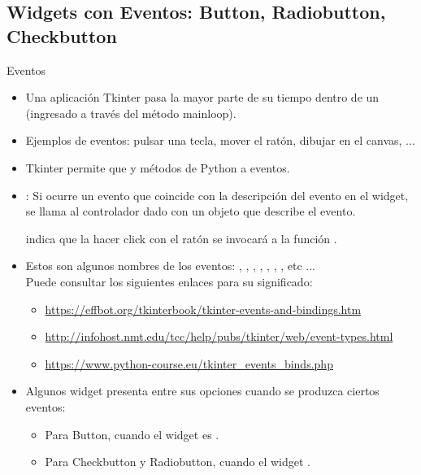 \documentclass[10pt, envcountsect , spanish]{beamer}
\begin{document}
\subsection{Widgets con Eventos: Button, Radiobutton, Checkbutton}


\begin{frame}{Eventos}

\begin{itemize}
\item Una aplicación Tkinter pasa la mayor parte de su tiempo dentro de un  (ingresado a través del método mainloop). 
\item Ejemplos de eventos: pulsar una tecla, mover el ratón, dibujar en el canvas, ...
\item Tkinter permite que  y métodos de Python a eventos.

\item {}: Si ocurre un evento que coincide con la descripción del evento en el widget, se llama al controlador dado con un objeto que describe el evento.

\unEjemplo {} indica que la hacer click con el ratón se invocará a la función .

\item Estos son algunos nombres de los eventos: , , , , , , , etc ... \\
Puede consultar los siguientes enlaces para su significado: 
	\begin{itemize}\itemsep0pt \tiny
	\item \url{https://effbot.org/tkinterbook/tkinter-events-and-bindings.htm}
	\item \url{http://infohost.nmt.edu/tcc/help/pubs/tkinter/web/event-types.html}
	\item \url{https://www.python-course.eu/tkinter_events_binds.php}
	\end{itemize}
	
	
\item Algunos widget presenta  entre sus opciones  cuando se produzca ciertos eventos:
	\begin{itemize}
	\item Para Button, cuando el widget es . 
	\item Para Checkbutton y Radiobutton, cuando el widget . 
	\end{itemize}
\end{itemize}
\end{frame}
\end{document}
